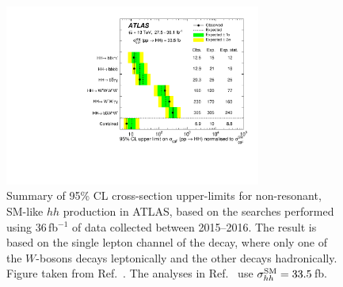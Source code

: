 \begin{figure}[!htb]
    \begin{center}
        \includegraphics[width=0.75\textwidth]{figures/search_hh/hh_intro/hh_comb_36}
        \caption{
            Summary of 95\% CL cross-section upper-limits for non-resonant, SM-like $hh$
            production in ATLAS, based on the searches performed using 36\,fb$^{-1}$ of
            data collected between 2015--2016.
            The \bbww result is based on the single lepton channel of the \bbww decay,
            where only one of the $W$-bosons decays leptonically and the other decays hadronically.
            Figure taken from Ref.~\cite{HHComb36}.
            The analyses in Ref.~\cite{HHComb36} use $\sigma_{hh}^{\text{SM}} = 33.5$\,fb.
        }
        \label{fig:hh_comb_36}
    \end{center}
\end{figure}

%
%
\FloatBarrier

\FloatBarrier


\FloatBarrier

\FloatBarrier

